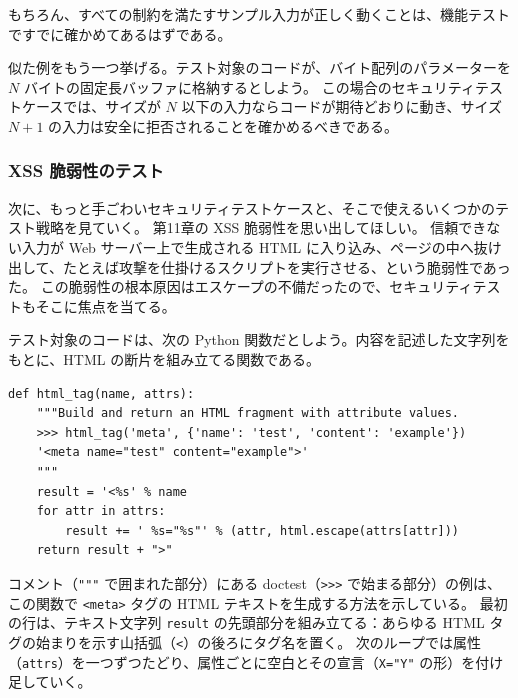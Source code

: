 \documentclass[uplatex]{jsarticle}
\def\label#1{}%
\begin{document}
もちろん、すべての制約を満たすサンプル入力が正しく動くことは、機能テストですでに確かめてあるはずである。

\begin{exa}[固定長バッファ]\label{exa:ch12-fixed-buffer-tests}
似た例をもう一つ挙げる。テスト対象のコードが、バイト配列のパラメーターを $N$ バイトの固定長バッファに格納するとしよう。
この場合のセキュリティテストケースでは、サイズが $N$ 以下の入力ならコードが期待どおりに動き、サイズ $N+1$ の入力は安全に拒否されることを確かめるべきである。
\end{exa}

\subsubsection{XSS 脆弱性のテスト}

次に、もっと手ごわいセキュリティテストケースと、そこで使えるいくつかのテスト戦略を見ていく。
第11章の XSS 脆弱性を思い出してほしい。
信頼できない入力が Web サーバー上で生成される HTML に入り込み、ページの中へ抜け出して、たとえば攻撃を仕掛けるスクリプトを実行させる、という脆弱性であった。
この脆弱性の根本原因はエスケープの不備だったので、セキュリティテストもそこに焦点を当てる。

テスト対象のコードは、次の Python 関数だとしよう。内容を記述した文字列をもとに、HTML の断片を組み立てる関数である。

\begin{exa}\label{exa:ch12-html-tag}
\begin{verbatim}
def html_tag(name, attrs):
    """Build and return an HTML fragment with attribute values.
    >>> html_tag('meta', {'name': 'test', 'content': 'example'})
    '<meta name="test" content="example">'
    """
    result = '<%s' % name
    for attr in attrs:
        result += ' %s="%s"' % (attr, html.escape(attrs[attr]))
    return result + ">"
\end{verbatim}
\end{exa}

コメント（\texttt{"""} で囲まれた部分）にある doctest（\texttt{>>>} で始まる部分）の例は、この関数で \texttt{<meta>} タグの HTML テキストを生成する方法を示している。
最初の行は、テキスト文字列 \texttt{result} の先頭部分を組み立てる：あらゆる HTML タグの始まりを示す山括弧（\texttt{<}）の後ろにタグ名を置く。
次のループでは属性（\texttt{attrs}）を一つずつたどり、属性ごとに空白とその宣言（\texttt{X="Y"} の形）を付け足していく。
\end{document}
